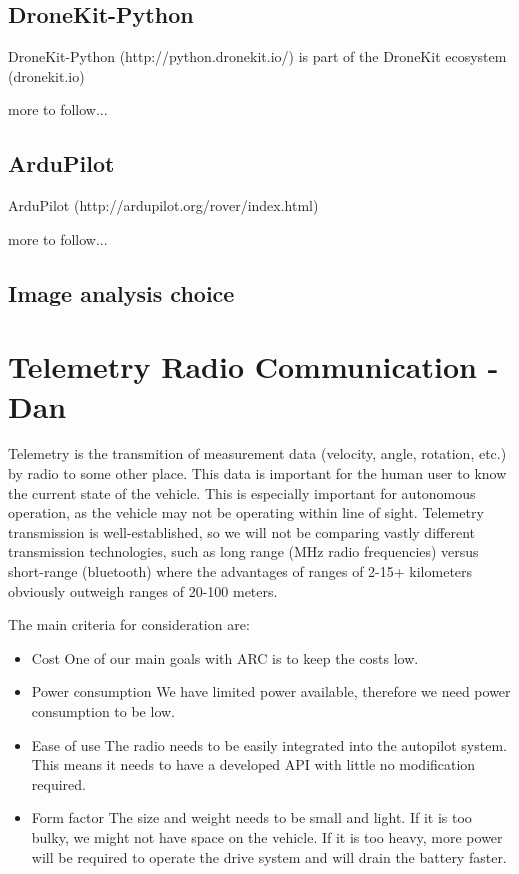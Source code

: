 \documentclass[compsoc,draftclsnofoot,onecolumn,10pt]{IEEEtran}
\begin{document}
\subsection{DroneKit-Python}
DroneKit-Python (http://python.dronekit.io/) is part of the DroneKit ecosystem (dronekit.io)\par
more to follow...

\subsection{ArduPilot}
ArduPilot (http://ardupilot.org/rover/index.html)\par
more to follow...

\subsection{Image analysis choice}

\section{Telemetry Radio Communication - Dan}
Telemetry is the transmition of measurement data (velocity, angle, rotation, etc.)
by radio to some other place. This data is important for the human user to
know the current state of the vehicle. This is especially important for
autonomous operation, as the vehicle may not be operating within line of
sight. Telemetry transmission is well-established, so we will not be comparing
vastly different transmission technologies, such as long range (MHz radio frequencies)
versus short-range (bluetooth) where the advantages of ranges of 2-15+
kilometers obviously outweigh ranges of 20-100 meters.

The main criteria for consideration are:
\begin{itemize}
	\item Cost
		\subitem One of our main goals with ARC is to keep the costs low.
	\item Power consumption
		\subitem We have limited power available, therefore we need power consumption to
	be low.
	\item Ease of use
		\subitem The radio needs to be easily integrated into the autopilot system. This
	means it needs to have a developed API with little no modification
	required.
	\item Form factor
		\subitem The size and weight needs to be small and light. If it is too bulky, we
	might not have space on the vehicle. If it is too heavy, more power will
	be required to operate the drive system and will drain the battery
	faster.
\end{itemize}
\end{document}
